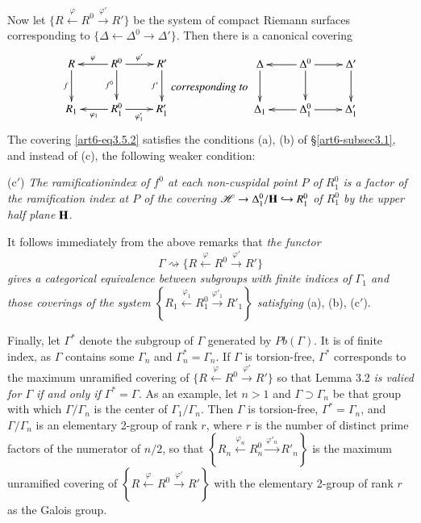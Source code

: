 Now let $\{R \xleftarrow{\varphi} R^0 \xrightarrow{\varphi'} R'\}$ be the system of compact Riemann surfaces corresponding to $\{\Delta \leftarrow \Delta^0 \rightarrow \Delta'\}$. Then there is a canonical covering 
\begin{equation}
\vcenter{
\xymatrix{
R \ar[d]_-f & R^0\ar[r]^-{\varphi'}\ar[d]_-{f^0}\ar[l]_-{\varphi} & R' \ar[d]_-{f'}\\
R_1 & R^0_1 \ar[r]_-{\varphi'_1} \ar[l]^-{\varphi_1} & R'_1
}}
\textit{corresponding to }
\vcenter{
\xymatrix{
\Delta \ar[d] & \Delta^0\ar[r] \ar[d] \ar[l]& \Delta' \ar[d]\\
\Delta_1 & \Delta^0_1 \ar[r] \ar[l]& \Delta'_1
}}\label{art6-eq3.5.2}
\end{equation}
The covering \eqref{art6-eq3.5.2} satisfies the conditions (a), (b) of \S \ref{art6-subsec3.1}, and instead of (c), the following weaker condition:

(c$'$) \textit{The ramification\pageoriginale index of $f^0$ at each non-cuspidal point $P$ of $R^0_1$ is a factor of the ramification index at $P$ of the covering $\mathscr{H} \to \Delta^0_1 / \mathbf{H} \hookrightarrow R^0_1$ of $R^0_1$ by the upper half plane $\mathbf{H}$}.

It follows immediately from the above remarks that \textit{the functor}
\begin{equation}
\Gamma \rightsquigarrow \{R \xleftarrow{\varphi} R^0 \xrightarrow{\varphi'} R'\} \label{art6-eq3.5.3}
\end{equation}
\textit{gives a categorical equivalence between subgroups with finite indices of $\Gamma_1$ and those coverings of the system $\left\{R_1 \xleftarrow{\varphi_1} R^0_1  \xrightarrow{\varphi'_1} R'_1\right\}$ satisfying} (a), (b), (c$'$).

Finally, let $\Gamma^\ast$ denote the subgroup of $\Gamma$ generated by $Pb(\Gamma)$. It is of finite index, as $\Gamma$ contains some $\Gamma_n$ and $\Gamma^\ast_n = \Gamma_n$. If $\Gamma$ is torsion-free, $\Gamma^\ast$ corresponds to the maximum unramified covering of $\{R \xleftarrow{\varphi} R^0 \xrightarrow{\varphi'} R'\}$ so that Lemma 3.2 \textit{is valied for $\Gamma$ if and only if $\Gamma^\ast = \Gamma$.} As an example, let $n >1$  and $\Gamma \supset \Gamma_n$ be that group with which $\Gamma / \Gamma_n$ is the center of $\Gamma_1 / \Gamma_n$. Then $\Gamma$ is torsion-free, $\Gamma^\ast = \Gamma_n$, and $\Gamma / \Gamma_n$ is an elementary 2-group of rank $r$, where $r$ is the number of distinct prime factors of the numerator of $n/2$, so that $\left\{R_n \xleftarrow{\varphi_n} R^0_n \xrightarrow{\varphi'_n} R'_n\right\}$ is the maximum unramified covering of $\left\{R \xleftarrow{\varphi} R^0 \xrightarrow{\varphi'} R' \right\}$ with the elementary 2-group of rank $r$ as the Galois group.

